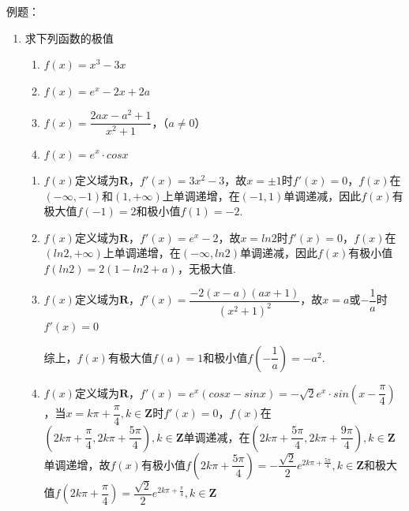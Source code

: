 例题：
\begin{enumerate}
    \item 求下列函数的极值
    \begin{enumerate}
        \item $f(x) = x^3 - 3x$
        \item $f(x) = e^x - 2x + 2a$
        \item $f(x) = \dfrac{2ax-a^2+1}{x^2+1}$，（$a \neq 0$）
        \item $f(x) = e^x \cdot cosx$
    \end{enumerate}
    \begin{jieda}
        \begin{enumerate}
            \item $f(x)$定义域为$\mathbf{R}$，$f'(x) = 3x^2-3$，故$x = \pm 1$时$f'(x) = 0$，$f(x)$在$(-\infty, -1)$和$(1, +\infty)$上单调递增，在$(-1, 1)$单调递减，因此$f(x)$有极大值$f(-1) = 2$和极小值$f(1) = -2$.
            \item $f(x)$定义域为$\mathbf{R}$，$f'(x) = e^x-2$，故$x = ln2$时$f'(x) = 0$，$f(x)$在$(ln2, +\infty)$上单调递增，在$(-\infty, ln2)$单调递减，因此$f(x)$有极小值$f(ln2) = 2(1-ln2+a)$，无极大值.
            \item $f(x)$定义域为$\mathbf{R}$，$f'(x) = \dfrac{-2(x-a)(ax+1)}{(x^2+1)^2}$，故$x = a$或$-\dfrac{1}{a}$时$f'(x) = 0$
            综上，$f(x)$有极大值$f(a) = 1$和极小值$f\left(-\dfrac{1}{a}\right) = -a^2$.
            \item $f(x)$定义域为$\mathbf{R}$，$f'(x) = e^x(cosx-sinx) = -\sqrt{2}e^x\cdot sin\left(x - \dfrac{\pi}{4}\right)$，当$x = k\pi + \dfrac{\pi}{4}, k \in \mathbf{Z}$时$f'(x) = 0$，$f(x)$在$\left(2k\pi+\dfrac{\pi}{4}, 2k\pi+\dfrac{5\pi}{4}\right), k \in \mathbf{Z}$单调递减，在$\left(2k\pi+\dfrac{5\pi}{4}, 2k\pi+\dfrac{9\pi}{4}\right), k \in \mathbf{Z}$单调递增，故$f(x)$有极小值$f\left(2k\pi+\dfrac{5\pi}{4}\right) = -\dfrac{\sqrt{2}}{2}e^{2k\pi+\frac{5\pi}{4}}, k \in \mathbf{Z}$和极大值$f\left(2k\pi+\dfrac{\pi}{4}\right) = \dfrac{\sqrt{2}}{2}e^{2k\pi+\frac{\pi}{4}}, k \in \mathbf{Z}$

\end{enumerate}
\end{jieda}
\end{enumerate}
